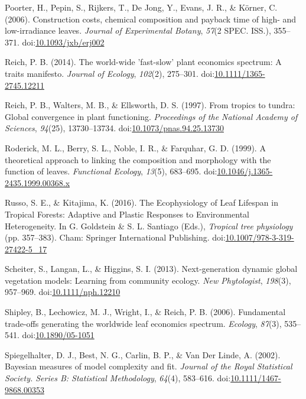 \documentclass[12pt,]{article}
\theoremstyle{definition}
\theoremstyle{definition}
\theoremstyle{definition}
\theoremstyle{remark}
\begin{document}
\leavevmode\hypertarget{ref-Poorter2006b}{}%
Poorter, H., Pepin, S., Rijkers, T., De Jong, Y., Evans, J. R., \&
Körner, C. (2006). Construction costs, chemical composition and payback
time of high- and low-irradiance leaves. \emph{Journal of Experimental
Botany}, \emph{57}(2 SPEC. ISS.), 355--371.
doi:\href{https://doi.org/10.1093/jxb/erj002}{10.1093/jxb/erj002}

\leavevmode\hypertarget{ref-Reich2014}{}%
Reich, P. B. (2014). The world-wide 'fast-slow' plant economics
spectrum: A traits manifesto. \emph{Journal of Ecology}, \emph{102}(2),
275--301.
doi:\href{https://doi.org/10.1111/1365-2745.12211}{10.1111/1365-2745.12211}

\leavevmode\hypertarget{ref-Reich1997}{}%
Reich, P. B., Walters, M. B., \& Ellsworth, D. S. (1997). From tropics
to tundra: Global convergence in plant functioning. \emph{Proceedings of
the National Academy of Sciences}, \emph{94}(25), 13730--13734.
doi:\href{https://doi.org/10.1073/pnas.94.25.13730}{10.1073/pnas.94.25.13730}

\leavevmode\hypertarget{ref-Roderick1999}{}%
Roderick, M. L., Berry, S. L., Noble, I. R., \& Farquhar, G. D. (1999).
A theoretical approach to linking the composition and morphology with
the function of leaves. \emph{Functional Ecology}, \emph{13}(5),
683--695.
doi:\href{https://doi.org/10.1046/j.1365-2435.1999.00368.x}{10.1046/j.1365-2435.1999.00368.x}

\leavevmode\hypertarget{ref-Russo2016}{}%
Russo, S. E., \& Kitajima, K. (2016). The Ecophysiology of Leaf Lifespan
in Tropical Forests: Adaptive and Plastic Responses to Environmental
Heterogeneity. In G. Goldstein \& S. L. Santiago (Eds.), \emph{Tropical
tree physiology} (pp. 357--383). Cham: Springer International
Publishing.
doi:\href{https://doi.org/10.1007/978-3-319-27422-5_17}{10.1007/978-3-319-27422-5\_17}

\leavevmode\hypertarget{ref-Scheiter2013}{}%
Scheiter, S., Langan, L., \& Higgins, S. I. (2013). Next-generation
dynamic global vegetation models: Learning from community ecology.
\emph{New Phytologist}, \emph{198}(3), 957--969.
doi:\href{https://doi.org/10.1111/nph.12210}{10.1111/nph.12210}

\leavevmode\hypertarget{ref-Shipley2006}{}%
Shipley, B., Lechowicz, M. J., Wright, I., \& Reich, P. B. (2006).
Fundamental trade-offs generating the worldwide leaf economics spectrum.
\emph{Ecology}, \emph{87}(3), 535--541.
doi:\href{https://doi.org/10.1890/05-1051}{10.1890/05-1051}

\leavevmode\hypertarget{ref-Spiegelhalter2002}{}%
Spiegelhalter, D. J., Best, N. G., Carlin, B. P., \& Van Der Linde, A.
(2002). Bayesian measures of model complexity and fit. \emph{Journal of
the Royal Statistical Society. Series B: Statistical Methodology},
\emph{64}(4), 583--616.
doi:\href{https://doi.org/10.1111/1467-9868.00353}{10.1111/1467-9868.00353}
\end{document}

